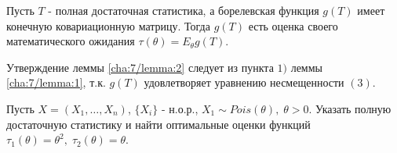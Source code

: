 \begin{lemma}\label{cha:7/lemma:2}
	Пусть $T$ - полная достаточная статистика, а борелевская функция $g(T)$ имеет конечную ковариационную матрицу. Тогда $g(T)$ есть оценка своего математического ожидания $\displaystyle \tau(\theta) = E_{\theta} g(T)$.
\end{lemma}

Утверждение леммы \ref{cha:7/lemma:2} следует из пункта $1)$ леммы \ref{cha:7/lemma:1}, т.к. $g(T)$ удовлетворяет уравнению несмещенности $(3)$.

\begin{example}
	Пусть $X = (X_1, \dots, X_n)$, $\{X_i\}$ - н.о.р., $X_1 \sim Pois (\theta), \; \theta > 0$. Указать полную достаточную статистику и найти оптимальные оценки функций $\tau_1(\theta) = \theta^2, \; \tau_2 (\theta) = \theta$.
\end{example}
